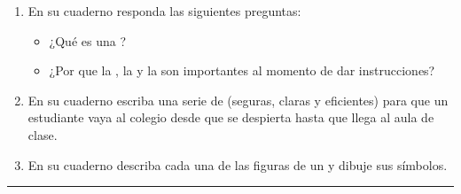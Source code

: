 \documentclass[letterpaper,10pt,spanish]{sphinxmanual}
\begin{document}
\begin{enumerate}
\begin{itemize}
\end{itemize}

\item {} 
\sphinxAtStartPar
En su cuaderno responda las siguientes preguntas:
\begin{itemize}
\item {} 
\sphinxAtStartPar
¿Qué es una ?

\item {} 
\sphinxAtStartPar
¿Por que la , la  y la  son importantes al momento de dar instrucciones?

\end{itemize}

\item {} 
\sphinxAtStartPar
En su cuaderno escriba una serie de  (seguras, claras y eficientes) para que un estudiante vaya al colegio desde que se despierta hasta que llega al aula de clase.

\item {} 
\sphinxAtStartPar
En su cuaderno describa cada una de las figuras de un  y dibuje sus símbolos.

\end{enumerate}


\bigskip\hrule\bigskip
\end{document}
